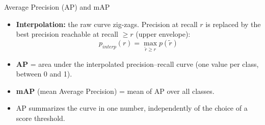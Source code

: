 \documentclass[xcolor=pdftex,dvipsnames,table]{beamer}
\begin{document}
\begin{frame}{Average Precision (AP) and mAP}
\begin{itemize}
  \item \textbf{Interpolation:} the raw curve zig-zags. Precision at recall $r$ is replaced by the best precision reachable at recall $\geq r$ (upper envelope):
  \begin{equation*}
  p_{interp}(r) = \max_{\tilde{r} \geq r} p(\tilde{r})
  \end{equation*}
  \item \textbf{AP} = area under the interpolated precision--recall curve (one value per class, between 0 and 1).
  \item \textbf{mAP} (mean Average Precision) = mean of AP over all classes.
  \item AP summarizes the curve in one number, independently of the choice of a score threshold.
\end{itemize}
\end{frame}

\end{document}
